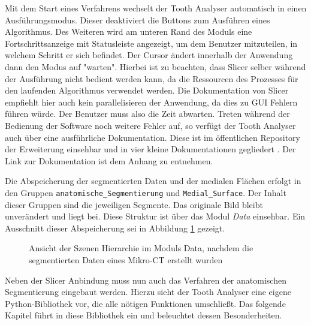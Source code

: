 Mit dem Start eines Verfahrens wechselt der Tooth Analyser automatisch in einen
Ausführungsmodus. Dieser deaktiviert die Buttons zum Ausführen eines Algorithmus.
Des Weiteren wird am unteren Rand des Moduls eine Fortschrittsanzeige mit
Statusleiste angezeigt, um dem Benutzer mitzuteilen, in welchem Schritt er sich
befindet. Der Cursor ändert innerhalb der Anwendung dann den Modus auf "warten".
Hierbei ist zu beachten, dass Slicer selber während der Ausführung nicht bedient
werden kann, da die Ressourcen des Prozesses für den laufenden Algorithmus
verwendet werden. Die Dokumentation von Slicer empfiehlt hier auch kein parallelisieren
der Anwendung, da dies zu \ac{GUI} Fehlern führen würde. Der Benutzer muss also
die Zeit abwarten. Treten während der Bedienung der Software noch weitere Fehler
auf, so verfügt der Tooth Analyser auch über eine ausführliche Dokumentation. Diese
ist im öffentlichen Repository der Erweiterung einsehbar und in vier kleine Dokumentationen
gegliedert \citep[vgl.][]{procida2017}. Der Link zur Dokumentation ist dem Anhang
zu entnehmen.

Die Abspeicherung der segmentierten Daten und der medialen Flächen erfolgt in den
Gruppen \texttt{anatomische\_Segmentierung} und \texttt{Medial\_Surface}. Der
Inhalt dieser Gruppen sind die jeweiligen Segmente. Das originale Bild bleibt unverändert
und liegt bei. Diese Struktur ist über das Modul \textit{Data} einsehbar. Ein
Ausschnitt dieser Abspeicherung sei in Abbildung \ref{fig:data_module} gezeigt.

\pagebreak

\begin{figure}[h]
	\centering
	\caption{Ansicht der Szenen Hierarchie im Moduls Data, nachdem die segmentierten
	Daten eines Mikro-CT erstellt wurden}
	\label{fig:data_module}
\end{figure}

Neben der Slicer Anbindung muss nun auch das Verfahren der anatomischen
Segmentierung eingebaut werden. Hierzu sieht der Tooth Analyser eine eigene Python-Bibliothek
vor, die alle nötigen Funktionen umschließt. Das folgende Kapitel führt in diese
Bibliothek ein und beleuchtet dessen Besonderheiten.

